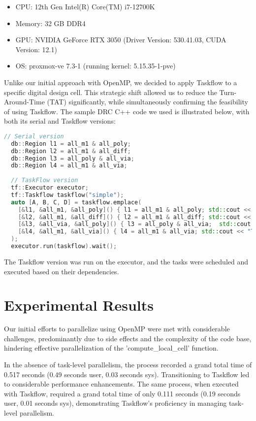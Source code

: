 \documentclass[sigconf]{acmart}
\begin{document}
    \begin{itemize}
      \item CPU: 12th Gen Intel(R) Core(TM) i7-12700K
      \item Memory: 32 GB DDR4 
      \item GPU: NVIDIA GeForce RTX 3050 (Driver Version: 530.41.03, CUDA Version: 12.1)
      \item OS: proxmox-ve 7.3-1 (running kernel: 5.15.35-1-pve)
    \end{itemize}
    
    Unlike our initial approach with OpenMP, we decided to apply Taskflow to a specific digital design cell. This strategic shift allowed us to reduce the Turn-Around-Time (TAT) significantly, while simultaneously confirming the feasibility of using Taskflow. The sample DRC C++ code we used is illustrated below, with both its serial and Taskflow versions:
    
    \begin{lstlisting}[language=C++, caption=DRC operation using both Serial and Taskflow approaches,  label=DRC_operation_code]
  // Serial version
  db::Region l1 = all_m1 & all_poly;
  db::Region l2 = all_m1 & all_diff;
  db::Region l3 = all_poly & all_via;
  db::Region l4 = all_m1 & all_via;
  
  // TaskFlow version
  tf::Executor executor;
  tf::Taskflow taskflow("simple");
  auto [A, B, C, D] = taskflow.emplace(
    [&l1, &all_m1, &all_poly]() { l1 = all_m1 & all_poly; std::cout << "TaskA\n"; },
    [&l2, &all_m1, &all_diff]() { l2 = all_m1 & all_diff; std::cout << "TaskB\n"; },
    [&l3, &all_via, &all_poly]() { l3 = all_poly & all_via;  std::cout << "TaskC\n"; },
    [&l4, &all_m1, &all_via]() { l4 = all_m1 & all_via; std::cout << "TaskD\n"; }
  );
  executor.run(taskflow).wait();
    \end{lstlisting}
    
    The Taskflow version was run on the executor, and the tasks were scheduled and executed based on their dependencies.
  
  
    \section{Experimental Results}
    Our initial efforts to parallelize using OpenMP were met with considerable challenges, predominantly due to side effects and the complexity of the code base, hindering effective parallelization of the 'compute\_local\_cell' function.
  
    In the absence of task-level parallelism, the process recorded a grand total time of 0.517 seconds (0.49 seconds user, 0.03 seconds sys). Transitioning to Taskflow led to considerable performance enhancements. The same process, when executed with Taskflow, required a grand total time of only 0.111 seconds (0.19 seconds user, 0.01 seconds sys), demonstrating Taskflow's proficiency in managing task-level parallelism.
  
\end{document}
